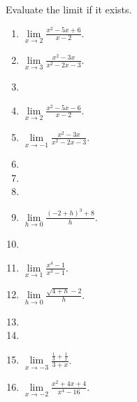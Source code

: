 Evaluate the limit if it exists.
\begin{multicols}{2}
\begin{enumerate}[ref={\fcProblemRef}]
\item $\displaystyle\lim\limits_{x\to 2}\frac{x^2-5x+6}{x-2} $. 

\item $\displaystyle\lim\limits_{x\to 3}\frac{x^2-3x}{x^2-2x-3} $.

\item 
\item $\displaystyle\lim\limits_{x\to 2}\frac{x^2-5x-6}{x-2} $.

\item $\displaystyle\lim\limits_{x\to -1}\frac{x^2-3x}{x^{2}-2x-3} $.


\item 
\item 
\item 
\item $\displaystyle\lim\limits_{h\to 0}\frac{(-2+h)^3+8}{h} $.

\item 
\item $\displaystyle\lim\limits_{x\to 1}\frac{x^4-1}{x^3-1} $.

\item $\displaystyle\lim\limits_{h\to 0}\frac{\sqrt{4+h}-2}{h} $.

\item 
\item 
\item $\displaystyle\lim\limits_{x\to -3} \frac{\frac{1}{3}+ \frac{1}{x}} {3+x}$.

\item $\displaystyle\lim\limits_{x\to -2} \frac{x^2+4x+4}{x^4-16}$.


\end{enumerate}
\end{multicols}
